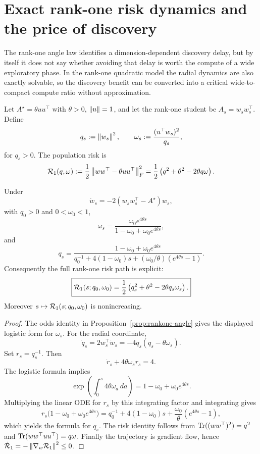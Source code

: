 \section{Exact rank-one risk dynamics and the price of discovery}
The rank-one angle law identifies a dimension-dependent discovery delay, but by itself it does not say whether avoiding that delay is worth the compute of a wide exploratory phase. In the rank-one quadratic model the radial dynamics are also exactly solvable, so the discovery benefit can be converted into a critical wide-to-compact compute ratio without approximation.

Let $A^\star=\theta uu^\top$ with $\theta>0$, $\left\lVert u\right\rVert=1$, and let the rank-one student be $A_s=w_sw_s^\top$. Define
\[
q_s:=\left\lVert w_s\right\rVert^2,
\qquad
\omega_s:=\frac{(u^\top w_s)^2}{q_s},
\]
for $q_s>0$. The population risk is
\[
\mathcal R_1(q,\omega)
:=\frac12\left\lVert ww^\top-\theta uu^\top\right\rVert_F^2
=\frac12\left(q^2+\theta^2-2\theta q\omega\right).
\]

\begin{proposition}\label{prop:rankone-closed-form}
Under
\[
\dot w_s=-2(w_sw_s^\top-A^\star)w_s,
\]
with $q_0>0$ and $0<\omega_0<1$,
\[
\boxed{
\omega_s
=\frac{\omega_0e^{4\theta s}}
{1-\omega_0+\omega_0e^{4\theta s}},}
\]
and
\[
\boxed{
q_s
=
\frac{1-\omega_0+\omega_0e^{4\theta s}}
{q_0^{-1}+4(1-\omega_0)s+(\omega_0/\theta)(e^{4\theta s}-1)}.}
\]
Consequently the full rank-one risk path is explicit:
\[
\boxed{
\mathcal R_1(s;q_0,\omega_0)
=\frac12\left(q_s^2+\theta^2-2\theta q_s\omega_s\right).}
\]
Moreover $s\mapsto\mathcal R_1(s;q_0,\omega_0)$ is nonincreasing.
\end{proposition}

\begin{proof}
The odds identity in Proposition~\ref{prop:rankone-angle} gives the displayed logistic form for $\omega_s$. For the radial coordinate,
\[
\dot q_s
=2w_s^\top\dot w_s
=-4q_s(q_s-\theta\omega_s).
\]
Set $r_s=q_s^{-1}$. Then
\[
\dot r_s+4\theta\omega_s r_s=4.
\]
The logistic formula implies
\[
\exp\left(\int_0^s4\theta\omega_a\,da\right)
=1-\omega_0+\omega_0e^{4\theta s}.
\]
Multiplying the linear ODE for $r_s$ by this integrating factor and integrating gives
\[
r_s\bigl(1-\omega_0+\omega_0e^{4\theta s}\bigr)
=q_0^{-1}+4(1-\omega_0)s
+\frac{\omega_0}{\theta}(e^{4\theta s}-1),
\]
which yields the formula for $q_s$. The risk identity follows from
$\operatorname{Tr}((ww^\top)^2)=q^2$ and
$\operatorname{Tr}(ww^\top uu^\top)=q\omega$.
Finally the trajectory is gradient flow, hence
$\dot{\mathcal R}_1=-\left\lVert \nabla_w\mathcal R_1\right\rVert^2\le0$.
\end{proof}

